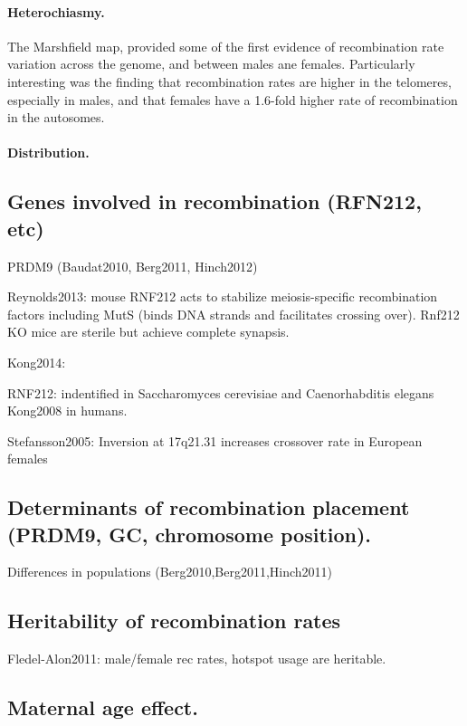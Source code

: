 \paragraph{Heterochiasmy.}

The Marshfield map\cite{Broman1998}, provided some of the first evidence of recombination rate variation across the genome, and between males ane females.
Particularly interesting was the finding that recombination rates are higher in the telomeres, especially in males, and that females have a 1.6-fold higher rate of recombination in the autosomes.

\paragraph{Distribution.}

\subsection{Genes involved in recombination (RFN212, etc)}

PRDM9 (Baudat2010, Berg2011, Hinch2012)

Reynolds2013: mouse RNF212 acts to stabilize meiosis-specific recombination factors including MutS (binds DNA strands and facilitates crossing over).
Rnf212 KO mice are sterile but achieve complete synapsis.

Kong2014: 

RNF212: indentified in Saccharomyces cerevisiae and Caenorhabditis elegans
Kong2008 in humans.

Stefansson2005: Inversion at 17q21.31 increases crossover rate in European females

\subsection{Determinants of recombination placement (PRDM9, GC, chromosome position).}

Differences in populations (Berg2010,Berg2011,Hinch2011)

\subsection{Heritability of recombination rates}
Fledel-Alon2011: male/female rec rates, hotspot usage are heritable.

\subsection{Maternal age effect.}

